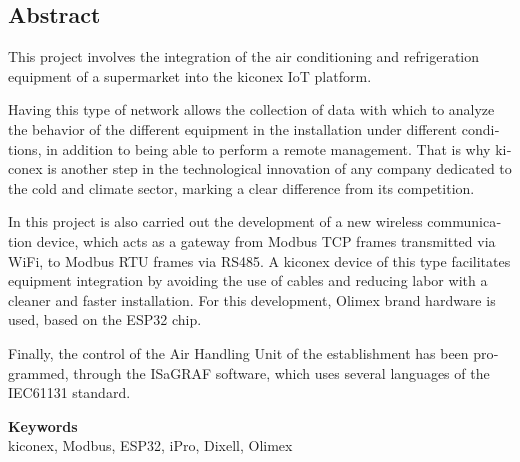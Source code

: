 \begin{otherlanguage}{english}
    \chapter*{Abstract}
  
    This project involves the integration of the air conditioning and refrigeration equipment of a supermarket into the kiconex IoT platform.

    Having this type of network allows the collection of data with which to analyze the behavior of the different equipment in the installation under different conditions, in addition to being able to perform a remote management. That is why kiconex is another step in the technological innovation of any company dedicated to the cold and climate sector, marking a clear difference from its competition.
    
    In this project is also carried out the development of a new wireless communication device, which acts as a gateway from Modbus TCP frames transmitted via WiFi, to Modbus RTU frames via RS485. A kiconex device of this type facilitates equipment integration by avoiding the use of cables and reducing labor with a cleaner and faster installation. For this development, Olimex brand hardware is used, based on the ESP32 chip.
    
    Finally, the control of the Air Handling Unit of the establishment has been programmed, through the ISaGRAF software, which uses several languages of the IEC61131 standard. 

    \vspace{10mm}

    \begin{center}
    \textbf{\Large{Keywords}} \\
    \vspace{10mm}
    kiconex, Modbus, ESP32, iPro, Dixell, Olimex 
    \end{center}
   \end{otherlanguage}
\clearpage